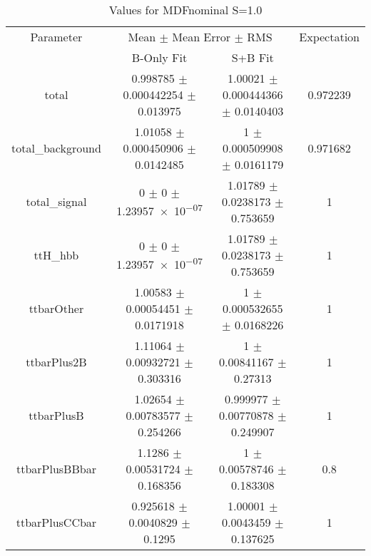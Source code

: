 \begin{table}
\centering
\caption{Values for MDFnominal S=1.0}
\begin{tabular}{cccc}
\toprule
Parameter & \multicolumn{2}{c}{Mean $\pm$ Mean Error $\pm$ RMS} & Expectation\\
 & B-Only Fit & S+B Fit & \\
\midrule
total & \num{0.998785} $\pm$ \num{0.000442254} $\pm$ \num{0.013975} & \num{1.00021} $\pm$ \num{0.000444366} $\pm$ \num{0.0140403} & \num{0.972239}\\
total\_background & \num{1.01058} $\pm$ \num{0.000450906} $\pm$ \num{0.0142485} & \num{1} $\pm$ \num{0.000509908} $\pm$ \num{0.0161179} & \num{0.971682}\\
total\_signal & \num{0} $\pm$ \num{0} $\pm$ \num{1.23957e-07} & \num{1.01789} $\pm$ \num{0.0238173} $\pm$ \num{0.753659} & \num{1}\\
ttH\_hbb & \num{0} $\pm$ \num{0} $\pm$ \num{1.23957e-07} & \num{1.01789} $\pm$ \num{0.0238173} $\pm$ \num{0.753659} & \num{1}\\
ttbarOther & \num{1.00583} $\pm$ \num{0.00054451} $\pm$ \num{0.0171918} & \num{1} $\pm$ \num{0.000532655} $\pm$ \num{0.0168226} & \num{1}\\
ttbarPlus2B & \num{1.11064} $\pm$ \num{0.00932721} $\pm$ \num{0.303316} & \num{1} $\pm$ \num{0.00841167} $\pm$ \num{0.27313} & \num{1}\\
ttbarPlusB & \num{1.02654} $\pm$ \num{0.00783577} $\pm$ \num{0.254266} & \num{0.999977} $\pm$ \num{0.00770878} $\pm$ \num{0.249907} & \num{1}\\
ttbarPlusBBbar & \num{1.1286} $\pm$ \num{0.00531724} $\pm$ \num{0.168356} & \num{1} $\pm$ \num{0.00578746} $\pm$ \num{0.183308} & \num{0.8}\\
ttbarPlusCCbar & \num{0.925618} $\pm$ \num{0.0040829} $\pm$ \num{0.1295} & \num{1.00001} $\pm$ \num{0.0043459} $\pm$ \num{0.137625} & \num{1}\\
\bottomrule
\end{tabular}
\end{table}